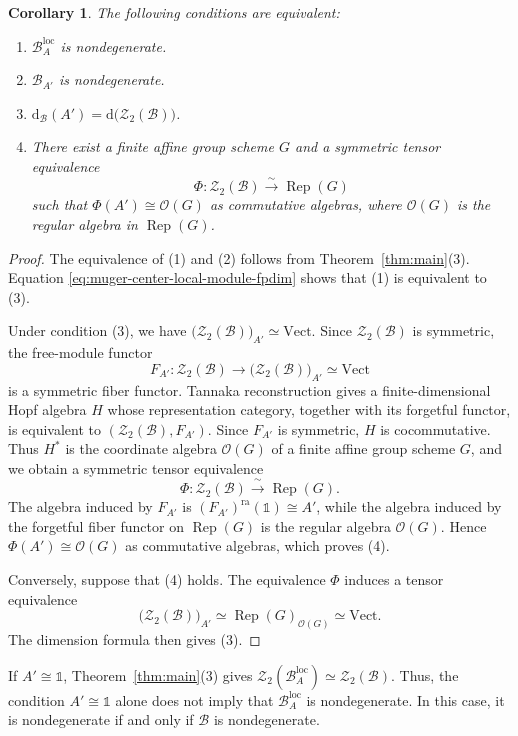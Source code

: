 \documentclass[11pt,reqno]{amsart}
\numberwithin{equation}{section}
\theoremstyle{plain}
\newtheorem{corollary}[thmctr]{Corollary}
\theoremstyle{definition}
\theoremstyle{remark}
\newcommand{\unit}{\mathds{1}}
\newcommand{\B}{\mathcal{B}}
\newcommand{\Z}{\mathcal{Z}}
\newcommand{\loc}{\mathrm{loc}}
\newcommand{\ra}{\mathrm{ra}}
\newcommand{\FP}{\mathrm{d}}
\newcommand{\Vect}{\mathrm{Vect}}
\begin{document}
\begin{corollary}\label{cor:local-module-nondegeneracy}
The following conditions are equivalent:
\begin{enumerate}
  \item $\B_A^{\loc}$ is nondegenerate.
  \item $\B_{A'}$ is nondegenerate.
  \item $\FP_{\B}(A')=\FP\bigl(\Z_2(\B)\bigr)$.
  \item There exist a finite affine group scheme $G$ and a symmetric tensor
  equivalence
  \[
    \Phi:\Z_2(\B)\xrightarrow{\ \sim\ }\operatorname{Rep}(G)
  \]
  such that $\Phi(A')\cong\mathcal O(G)$ as commutative algebras, where
  $\mathcal O(G)$ is the regular algebra in $\operatorname{Rep}(G)$.
\end{enumerate}
\end{corollary}
\begin{proof}
The equivalence of (1) and (2) follows from
Theorem~\ref{thm:main}(3). Equation
\eqref{eq:muger-center-local-module-fpdim} shows that (1) is equivalent to
(3).

Under condition (3), we have
$\bigl(\Z_2(\B)\bigr)_{A'}\simeq\Vect$. Since $\Z_2(\B)$ is symmetric,
the free-module functor
\[
  F_{A'}:\Z_2(\B)\longrightarrow
  \bigl(\Z_2(\B)\bigr)_{A'}\simeq\Vect
\]
is a symmetric fiber functor. Tannaka reconstruction
\cite[Theorem~5.3.12]{etingof2016tensor} gives a finite-dimensional Hopf
algebra $H$ whose representation category, together with its forgetful
functor, is equivalent to $(\Z_2(\B),F_{A'})$. Since $F_{A'}$ is symmetric,
$H$ is cocommutative. Thus $H^*$ is the coordinate algebra $\mathcal O(G)$
of a finite affine group scheme $G$, and we obtain a symmetric tensor
equivalence
\[
  \Phi:\Z_2(\B)\xrightarrow{\ \sim\ }\operatorname{Rep}(G).
\]
The algebra induced by $F_{A'}$ is
$(F_{A'})^{\ra}(\unit)\cong A'$, while the algebra induced by the forgetful
fiber functor on $\operatorname{Rep}(G)$ is the regular algebra
$\mathcal O(G)$. Hence $\Phi(A')\cong\mathcal O(G)$ as commutative algebras,
which proves (4).

Conversely, suppose that (4) holds. The equivalence $\Phi$ induces a tensor
equivalence
\[
  \bigl(\Z_2(\B)\bigr)_{A'}\simeq
  \operatorname{Rep}(G)_{\mathcal O(G)}\simeq\Vect.
\]
The dimension formula then gives (3).
\end{proof}

If $A'\cong\unit$, Theorem~\ref{thm:main}(3) gives
$\Z_2(\B_A^{\loc})\simeq\Z_2(\B)$. Thus, the condition
$A'\cong\unit$ alone does not imply that
$\B_A^{\loc}$ is nondegenerate. In this case, it is nondegenerate if and
only if $\B$ is nondegenerate.
\end{document}
